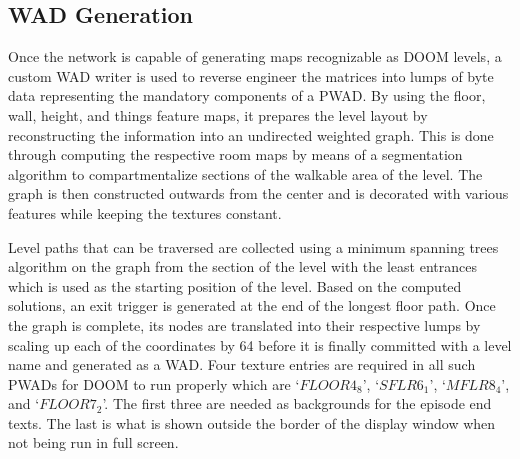 \documentclass{Configuration_Files/PoliMi3i_thesis}
\begin{document}
\subsection{WAD Generation}
Once the network is capable of generating maps recognizable as DOOM levels, a 
custom WAD writer is used to reverse engineer the matrices into lumps of byte data 
representing the mandatory components of a PWAD. By using the floor, wall, height, 
and things feature maps, it prepares the level layout by reconstructing the 
information into an undirected weighted graph. This is done through computing the 
respective room maps by means of a segmentation algorithm to compartmentalize 
sections of the walkable area of the level. The graph is then constructed outwards 
from the center and is decorated with various features while keeping the textures 
constant. 

Level paths that can be traversed are collected using a minimum spanning trees 
algorithm on the graph from the section of the level with the least entrances which is 
used as the starting position of the level. Based on the computed solutions, an exit 
trigger is generated at the end of the longest floor path. Once the graph is complete, 
its nodes are translated into their respective lumps by scaling up each of the 
coordinates by 64 before it is finally committed with a level name and generated as a 
WAD. Four texture entries are required in all such PWADs for DOOM to run 
properly which are $‘FLOOR4_8$’, ‘$SFLR6_1$’, ‘$MFLR8_4$’, and ‘$FLOOR7_2$’. The first 
three are needed as backgrounds for the episode end texts. The last is what is shown 
outside the border of the display window when not being run in full screen.
\end{document}
